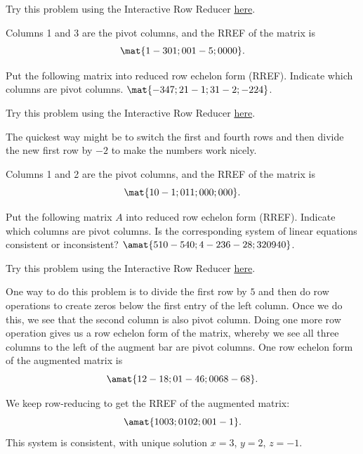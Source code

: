 \begin{problems}
  \begin{solution}
    Try this problem using the Interactive Row Reducer
    \href{https://textbooks.math.gatech.edu/ila/demos/rrinter.html?mat=3,-9,0,3:1,-3,1,-4:4,-12,2,-6}{here}.

    Columns 1 and 3 are the pivot columns, and the RREF of the matrix
    is
    \[\mat{1 -3 0 1; 0 0 1 -5; 0 0 0 0}.\]
  \end{solution}

  \problem Put the following matrix into reduced row echelon form
  (RREF).  Indicate which columns are pivot columns.
  $\mat{-3 4 7; 2 1 -1; 3 1 -2; -2 2 4}$.
  
  \begin{solution}
    Try this problem using the Interactive Row Reducer
    \href{https://textbooks.math.gatech.edu/ila/demos/rrinter.html?mat=-3,4,7:2,1,-1:3,1,-2:-2,2,4}{here}.

    The quickest way might be to switch the first and fourth rows and
    then divide the new first row by $-2$ to make the numbers work
    nicely.
    
    Columns 1 and 2 are the pivot columns, and the RREF of the matrix
    is
    \[\mat{1 0 -1; 0 1 1; 0 0 0; 0 0 0}.\]
  \end{solution}

  \problem Put the following matrix $A$ into reduced row echelon form
  (RREF).  Indicate which columns are pivot columns.  Is the
  corresponding system of linear equations consistent or inconsistent?
  $\amat{5 10 -5 40; 4 -2 36 -28; 3 20 9 40}$.

  \begin{solution}
    Try this problem using the Interactive Row Reducer
    \href{https://textbooks.math.gatech.edu/ila/demos/rrinter.html?mat=5,10,-5,8:4,-2,36,-28:3,20,9,40}{here}.

    One way to do this problem is to divide the first row by $5$ and
    then do row operations to create zeros below the first entry of
    the left column.  Once we do this, we see that the second column
    is also pivot column.  Doing one more row operation gives us a row
    echelon form of the matrix, whereby we see all three columns to
    the left of the augment bar are pivot columns.  One row echelon form
    of the augmented matrix is
    \[\amat{1 2 -1 8; 0 1 -4 6; 0 0 68 -68}.\]

    We keep row-reducing to get the RREF of the augmented matrix:
    \[\amat{1 0 0 3; 0 1 0 2; 0 0 1 -1}.\]
    This system is consistent, with unique solution $x = 3$, $y = 2$,
    $z = -1$.
  \end{solution}
  



\end{problems}
